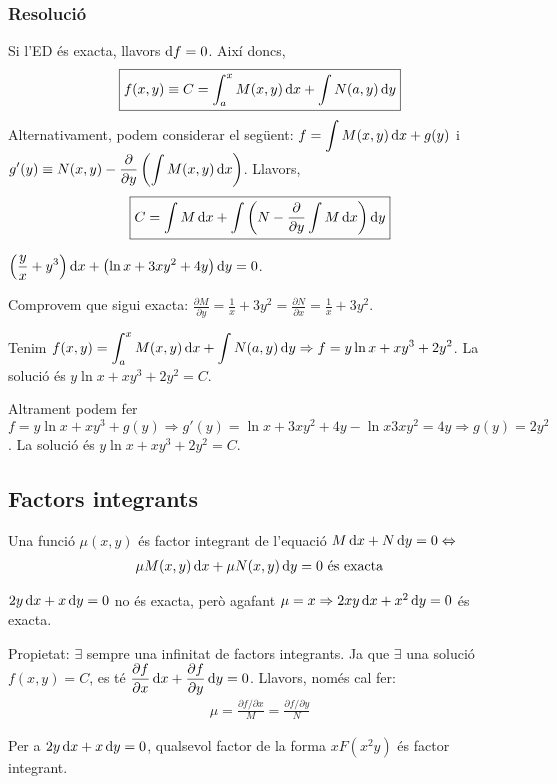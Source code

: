 \subsubsection*{Resolució}
Si l'ED és exacta, llavors $\mathrm{d} f = 0$. Així doncs,
\begin{align}
    \boxed{f(x,y) \equiv C = \int_{a}^{x} M(x,y) \mathop{}\!\mathrm{d} x + \int N(a,y) \mathop{}\!\mathrm{d} y}
\end{align}
Alternativament, podem considerar el següent: $\displaystyle f = \int M(x,y) \mathop{}\!\mathrm{d} x + g(y)$ i $\displaystyle g'(y) \equiv N(x,y) - \frac{\partial}{\partial y} \left( \int M(x,y) \mathop{}\!\mathrm{d} x \right)$. Llavors,
\begin{align}
	\boxed{C = \int M \mathop{}\!\mathrm{d} x + \int \left( N - \frac{\partial}{\partial y} \int M \mathop{}\!\mathrm{d} x \right) \mathop{}\!\mathrm{d} y}
\end{align}

\begin{example}
	$\displaystyle \left( \frac{y}{x} + y^{3} \right) \mathop{}\!\mathrm{d} x + \left( \ln x + 3x y^{2} + 4y \right) \mathop{}\!\mathrm{d} y = 0$.

	Comprovem que sigui exacta: $\displaystyle \frac{\partial M}{\partial y} = \frac{1}{x} + 3y^{2} = \frac{\partial N}{\partial x} = \frac{1}{x} + 3y^{2}$.

	Tenim  $\displaystyle f(x,y) = \int_{a}^{x} M(x,y) \mathop{}\!\mathrm{d} x + \int N(a,y) \mathop{}\!\mathrm{d} y \Rightarrow f = y \ln x + x y^{3} + 2y^{2}$. La solució és $\boxed{y \ln x + x y^{3} + 2y^{2} = C}$.

    Altrament podem fer $f = y \ln x + xy^{3} + g(y) \Rightarrow g'(y) = \ln x + 3xy^{2} + 4y - \ln x  3xy^{2} = 4y \Rightarrow g(y) = 2y^{2}$. La solució és $\boxed{y \ln x + x y^{3} + 2y^{2} = C}$.
\end{example}

\subsection{Factors integrants}
\begin{defi}
	Una funció $\mu(x,y)$ és factor integrant de l'equació $M \mathop{}\!\mathrm{d} x + N \mathop{}\!\mathrm{d} y = 0 \Leftrightarrow$
	\begin{align}
		\mu M(x,y) \mathop{}\!\mathrm{d} x + \mu N(x,y) \mathop{}\!\mathrm{d} y = 0 \text{ és exacta}
	\end{align}
\end{defi}
\begin{example}
	$2y \mathop{}\!\mathrm{d} x + x \mathop{}\!\mathrm{d} y = 0$ no és exacta, però agafant $\mu = x \Rightarrow 2xy \mathop{}\!\mathrm{d} x + x^{2} \mathop{}\!\mathrm{d} y = 0$ és exacta.
\end{example}
Propietat: $\exists$ sempre una infinitat de factors integrants. Ja que $\exists$ una solució $f(x,y) = C$, es té $\displaystyle \frac{\partial f}{\partial x} \mathop{}\!\mathrm{d} x + \frac{\partial f}{\partial y} \mathop{}\!\mathrm{d} y = 0$. Llavors, només cal fer:
\begin{align}
	\boxed{\mu = \frac{\partial f / \partial x}{M} = \frac{\partial f / \partial y}{N}}
\end{align}
\begin{example}
	Per a $2y \mathop{}\!\mathrm{d} x + x \mathop{}\!\mathrm{d} y = 0$, qualsevol factor de la forma $x F(x^{2}y)$ és factor integrant.
\end{example}


